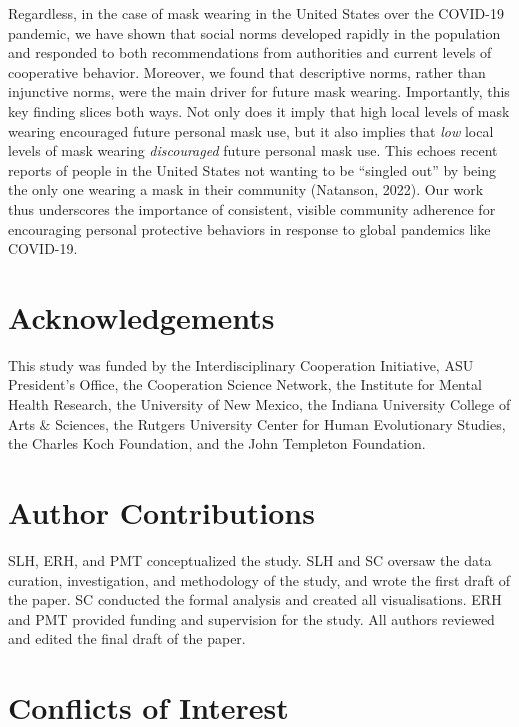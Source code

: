 \documentclass[
  english,
  man,floatsintext]{apa6}
\begin{document}
Regardless, in the case of mask wearing in the United States over the COVID-19 pandemic, we have shown that social norms developed rapidly in the population and responded to both recommendations from authorities and current levels of cooperative behavior. Moreover, we found that descriptive norms, rather than injunctive norms, were the main driver for future mask wearing. Importantly, this key finding slices both ways. Not only does it imply that high local levels of mask wearing encouraged future personal mask use, but it also implies that \emph{low} local levels of mask wearing \emph{discouraged} future personal mask use. This echoes recent reports of people in the United States not wanting to be ``singled out'' by being the only one wearing a mask in their community (Natanson, 2022). Our work thus underscores the importance of consistent, visible community adherence for encouraging personal protective behaviors in response to global pandemics like COVID-19.

\newpage

\hypertarget{acknowledgements}{%
\section{Acknowledgements}\label{acknowledgements}}

This study was funded by the Interdisciplinary Cooperation Initiative, ASU President's Office, the Cooperation Science Network, the Institute for Mental Health Research, the University of New Mexico, the Indiana University College of Arts \& Sciences, the Rutgers University Center for Human Evolutionary Studies, the Charles Koch Foundation, and the John Templeton Foundation.

\hypertarget{author-contributions}{%
\section{Author Contributions}\label{author-contributions}}

SLH, ERH, and PMT conceptualized the study. SLH and SC oversaw the data curation, investigation, and methodology of the study, and wrote the first draft of the paper. SC conducted the formal analysis and created all visualisations. ERH and PMT provided funding and supervision for the study. All authors reviewed and edited the final draft of the paper.

\hypertarget{conflicts-of-interest}{%
\section{Conflicts of Interest}\label{conflicts-of-interest}}
\end{document}
